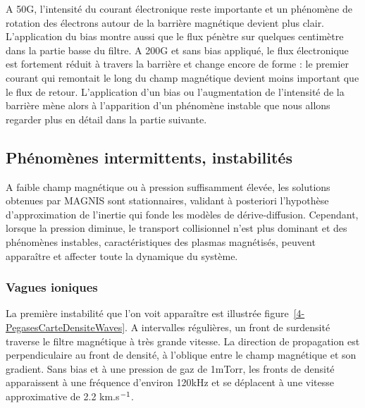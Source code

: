 \begin{refsection}
A 50G, l'intensité du courant électronique reste importante et un phénomène de
rotation des électrons autour de la barrière magnétique devient plus clair.
L'application du bias montre aussi que le flux pénètre sur quelques centimètre
dans la partie basse du filtre. A 200G et sans bias appliqué, le flux
électronique est fortement réduit à travers la barrière et change encore de
forme : le premier courant qui remontait le long du champ magnétique devient
moins important que le flux de retour. L'application d'un bias ou l'augmentation
de l'intensité de la barrière mène alors à l'apparition d'un phénomène instable
que nous allons regarder plus en détail dans la partie suivante.

\subsection{Phénomènes intermittents, instabilités}
A faible champ magnétique ou à pression suffisamment élevée, les solutions
obtenues par MAGNIS sont stationnaires, validant à posteriori l'hypothèse
d'approximation de l'inertie qui fonde les modèles de dérive-diffusion.
Cependant, lorsque la pression diminue, le transport collisionnel n'est plus
dominant et des phénomènes instables, caractéristiques des plasmas
magnétisés, peuvent apparaître et affecter toute la dynamique du système. 
 
\subsubsection{Vagues ioniques}
La première instabilité que l'on voit apparaître est illustrée
figure~\ref{4-PegasesCarteDensiteWaves}. A intervalles régulières, un front
de surdensité traverse le filtre magnétique à très grande vitesse. La direction
 de propagation est perpendiculaire au front de densité, à l'oblique entre le
 champ magnétique et son gradient. Sans bias et à une pression de gaz de 1mTorr,
 les fronts de densité apparaissent à une fréquence d'environ 120kHz et se
 déplacent à une vitesse approximative de 2.2 km.s$^{{-1}}$. 
 

\end{refsection}
